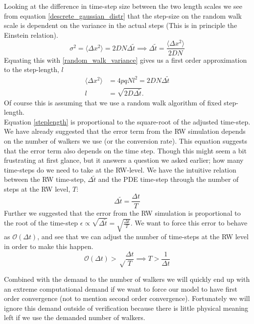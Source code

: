 Looking at the difference in time-step size between the two length scales we see from equation \ref{descrete_gaussian_distr} that the step-size on the random walk scale is dependent on the variance in the actual steps (This is in principle the Einstein relation). 
\begin{equation}
 \sigma^2 = \langle\Delta x^2\rangle = 2DN\Delta\tilde{t} \implies \Delta\tilde{t} = \frac{\langle\Delta x^2\rangle}{2DN}
\end{equation}
Equating this with \ref{random_walk_variance} gives us a first order approximation to the step-length, $l$
\begin{align}
 \langle\Delta x^2\rangle &= 4pqNl^2 = 2DN\Delta\tilde{t} \nonumber \\ 
 l &= \sqrt{2D\Delta\tilde{t}}. \label{steplength}
\end{align}
Of course this is assuming that we use a random walk algorithm of fixed step-length.\\
Equation \ref{steplength} is proportional to the square-root of the adjusted time-step. 
We have already suggested that the error term from the RW simulation depends on the number of walkers we use (or the conversion rate). This equation suggests that the error term also depends on the time step. 
Though this might seem a bit frustrating at first glance, but it answers a question we asked earlier; how many time-steps do we need to take at the RW-level. 
We have the intuitive relation between the RW time-step, $\Delta \tilde t$ and the PDE time-step through the number of steps at the RW level, $T$:
\begin{equation*}
 \Delta \tilde t = \frac{\Delta t}{T}
\end{equation*}
Further we suggested that the error from the RW simulation is proportional to the root of the time-step $\epsilon \propto \sqrt{\Delta \tilde t} = \sqrt{\frac{\Delta t}{T}}$. We want to force this error to behave as $\mathcal O(\Delta t)$, and see that we can adjust the number of time-steps at the RW level in order to make this happen.
\begin{equation}
 \mathcal O(\Delta t)>\sqrt \frac{\Delta t}{T} \implies T>\frac{1}{\Delta t}
\end{equation}

Combined with the demand to the number of walkers we will quickly end up with an extreme computational demand if we want to force our model to have first order convergence (not to mention second order convergence). 
Fortunately we will ignore this demand outside of verification because there is little physical meaning left if we use the demanded number of walkers.


